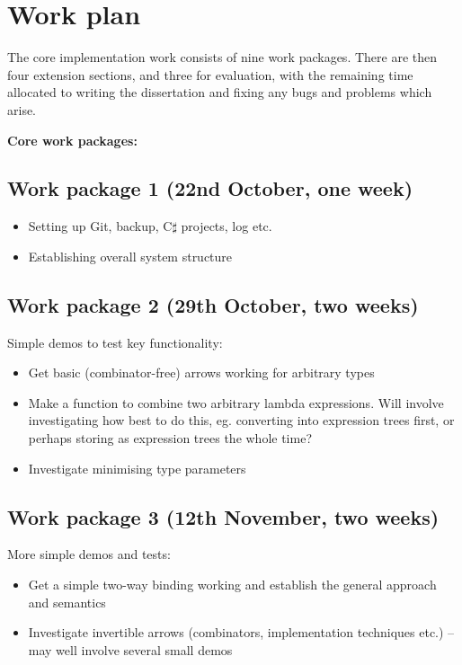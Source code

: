 \section*{Work plan}
	
	The core implementation work consists of nine work packages. There are then four extension sections, and three for evaluation, with the remaining time allocated to writing the dissertation and fixing any bugs and problems which arise.
	
	\noindent \textbf{Core work packages:}
	
	\subsection*{Work package 1 (22nd October, one week)}
		\begin{itemize}
			\item Setting up Git, backup, C$\sharp$ projects, log etc.
			\item Establishing overall system structure
		\end{itemize}
	
	\subsection*{Work package 2 (29th October, two weeks)}
		Simple demos to test key functionality:
		\begin{itemize}
			\item Get basic (combinator-free) arrows working for arbitrary types
			\item Make a function to combine two arbitrary lambda expressions. Will involve investigating how best to do this, eg. converting into expression trees first, or perhaps storing as expression trees the whole time?
			\item Investigate minimising type parameters
		\end{itemize}
	
	\subsection*{Work package 3 (12th November, two weeks)}
		More simple demos and tests:
		\begin{itemize}
			\item Get a simple two-way binding working and establish the general approach and semantics
			\item Investigate invertible arrows (combinators, implementation techniques etc.) -- may well involve several small demos
		\end{itemize}
	

